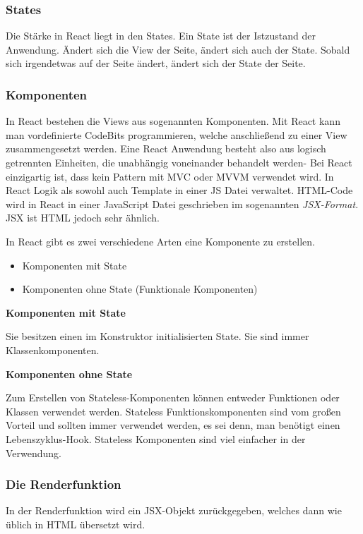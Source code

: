 \subsubsection{States}
Die Stärke in React liegt in den States. Ein State ist der Istzustand der Anwendung. Ändert sich 
die View der Seite, ändert sich auch der State. Sobald sich irgendetwas auf der Seite ändert, 
ändert sich der State der Seite.


\subsubsection{Komponenten}
In React bestehen die Views aus sogenannten Komponenten. Mit React kann man vordefinierte CodeBits 
programmieren, welche anschließend zu einer View zusammengesetzt werden. Eine React Anwendung 
besteht also aus logisch getrennten Einheiten, die unabhängig voneinander behandelt werden-
Bei React einzigartig ist, dass kein Pattern mit MVC oder MVVM verwendet wird. In React Logik als 
sowohl auch Template in einer JS Datei verwaltet.
HTML-Code wird in React in einer JavaScript Datei geschrieben im sogenannten \textit{JSX-Format}. 
JSX ist HTML jedoch sehr ähnlich.\cite{Komp}


In React gibt es zwei verschiedene Arten eine Komponente zu erstellen.
\begin{itemize}
  \item Komponenten mit State
  \item Komponenten ohne State (Funktionale Komponenten)\\
\end{itemize}

\centerline{\textbf{Komponenten mit State}}
Sie besitzen einen im Konstruktor initialisierten State. Sie sind immer Klassenkomponenten.\\

\centerline{\textbf{Komponenten ohne State}}
Zum Erstellen von Stateless-Komponenten können entweder Funktionen oder Klassen verwendet werden.
Stateless Funktionskomponenten sind vom großen Vorteil und sollten immer verwendet werden, es sei 
denn, man benötigt einen Lebenszyklus-Hook. Stateless Komponenten sind viel einfacher in der
Verwendung.\cite{KompState} 

\subsubsection{Die Renderfunktion}
In der Renderfunktion wird ein JSX-Objekt zurückgegeben, welches dann wie üblich in HTML
übersetzt wird. 

